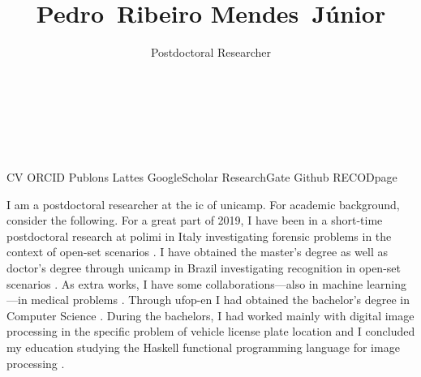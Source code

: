 

\title{Pedro~Ribeiro Mendes~Júnior}

\author{Postdoctoral Researcher\\%
  \\%
  \\%
  \\%
  \\%
}
\date{}



\maketitle

\begin{tags}
  \gls{CV}
  \gls{ORCID}
  \gls{Publons}
  \gls{Lattes}
  \gls{GoogleScholar}
  \gls{ResearchGate}
  \gls{Github}
  \gls{RECODpage}
\end{tags}

I am a postdoctoral researcher at the \gls{ic} of \gls{unicamp}.
For academic background, consider the following.
For a great part of 2019, I have been in a short-time postdoctoral research at \gls{polimi} in Italy investigating forensic problems in the context of open-set scenarios  .
I have obtained the master's degree  as well as doctor's degree  through \gls{unicamp} in Brazil investigating recognition in open-set scenarios  .
As extra works, I have some collaborations---also in machine learning---in medical problems  .
Through \gls{ufop-en} I had obtained the bachelor's degree in Computer Science .
During the bachelors, I had worked mainly with digital image processing in the specific problem of vehicle license plate location  and I concluded my education studying the Haskell functional programming language for image processing .

